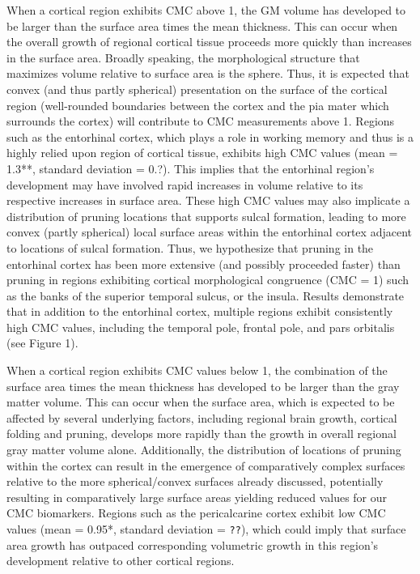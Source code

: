 \documentclass{article}
\begin{document}
When a cortical region exhibits CMC above 1, the GM volume has developed to
be larger than the surface area times the mean thickness. This can occur when
the overall growth of regional cortical tissue proceeds more quickly than
increases in the surface area. Broadly speaking, the morphological structure
that maximizes volume relative to surface area is the sphere. Thus, it is
expected that convex (and thus partly spherical) presentation on the surface
of the cortical region (well-rounded boundaries between the cortex and the
pia mater which surrounds the cortex) will contribute to CMC measurements
above 1. Regions such as the entorhinal cortex, which plays a role in working
memory and thus is a highly relied upon region of cortical tissue, exhibits
high CMC values (mean = 1.3**, standard deviation = 0.?). This implies that
the entorhinal region's development may have involved rapid increases in
volume relative to its respective increases in surface area. These high CMC
values may also implicate a distribution of pruning locations that supports
sulcal formation, leading to more convex (partly spherical) local surface
areas within the entorhinal cortex adjacent to locations of sulcal formation.
Thus, we hypothesize that pruning in the entorhinal cortex has been more
extensive (and possibly proceeded faster) than pruning in regions exhibiting
cortical morphological congruence (CMC = 1) such as the banks of the superior
temporal sulcus, or the insula. Results demonstrate that in addition to the
entorhinal cortex, multiple regions exhibit consistently high CMC values,
including the temporal pole, frontal pole, and pars orbitalis (see Figure 1).


When a cortical region exhibits CMC values below 1, the combination of the
surface area times the mean thickness has developed to be larger than the
gray matter volume. This can occur when the surface area, which is expected
to be affected by several underlying factors, including regional brain
growth, cortical folding and pruning, develops more rapidly than the growth
in overall regional gray matter volume alone. Additionally, the distribution
of locations of pruning within the cortex can result in the emergence of
comparatively complex surfaces relative to the more spherical/convex surfaces
already discussed, potentially resulting in comparatively large surface areas
yielding reduced values for our CMC biomarkers. Regions such as the
pericalcarine cortex exhibit low CMC values (mean = 0.95*, standard deviation
= \verb|??|), which could imply that surface area growth has outpaced corresponding
volumetric growth in this region's development relative to other cortical
regions.
\end{document}
